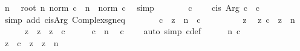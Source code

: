 \begin{isabellebody}
\ n\ \isamarkupfalse%
\ {\isachardoublequoteopen}root\ n\ {\isacharparenleft}{\kern0pt}norm\ c{\isacharparenright}{\kern0pt}\ {\isacharcircum}{\kern0pt}\ n\ {\isacharequal}{\kern0pt}\ norm\ c{\isachardoublequoteclose}\ \isamarkupfalse%
\ simp\isanewline
\ \ \ \ \isamarkupfalse%
\ \isamarkupfalse%
\ c\ \isamarkupfalse%
\ {\isachardoublequoteopen}{\isasymdots}\ {\isacharasterisk}{\kern0pt}\ cis\ {\isacharparenleft}{\kern0pt}Arg\ c{\isacharparenright}{\kern0pt}\ {\isacharequal}{\kern0pt}\ c{\isachardoublequoteclose}\ \isamarkupfalse%
\ {\isacharparenleft}{\kern0pt}simp\ add{\isacharcolon}{\kern0pt}\ cis{\isacharunderscore}{\kern0pt}Arg\ Complex{\isachardot}{\kern0pt}sgn{\isacharunderscore}{\kern0pt}eq{\isacharparenright}{\kern0pt}\isanewline
\ \ \ \ \isamarkupfalse%
\ \isamarkupfalse%
\ {\isachardoublequoteopen}{\isacharparenleft}{\kern0pt}c{\isacharprime}{\kern0pt}\ {\isacharasterisk}{\kern0pt}\ z{\isacharparenright}{\kern0pt}\ {\isacharcircum}{\kern0pt}\ n\ {\isacharequal}{\kern0pt}\ c{\isachardoublequoteclose}\ \isacommand{{\isachardot}{\kern0pt}}\isamarkupfalse%
\isanewline
\ \ \isamarkupfalse%
\isanewline
\ \ \ \ \isamarkupfalse%
\ z\ \isamarkupfalse%
\ z{\isacharcolon}{\kern0pt}\ {\isachardoublequoteopen}c\ {\isacharequal}{\kern0pt}\ z\ {\isacharcircum}{\kern0pt}\ n{\isachardoublequoteclose}\isanewline
\ \ \ \ \isamarkupfalse%
\ z{\isacharprime}{\kern0pt}\ \ {\isachardoublequoteopen}z{\isacharprime}{\kern0pt}\ {\isacharequal}{\kern0pt}\ z\ {\isacharslash}{\kern0pt}\ c{\isacharprime}{\kern0pt}{\isachardoublequoteclose}\isanewline
\ \ \ \ \isamarkupfalse%
\ c\ \ n\ \isamarkupfalse%
\ {\isachardoublequoteopen}c{\isacharprime}{\kern0pt}\ {\isasymnoteq}\ {}{\isachardoublequoteclose}\ \isamarkupfalse%
\ {\isacharparenleft}{\kern0pt}auto\ simp{\isacharcolon}{\kern0pt}\ c{\isacharprime}{\kern0pt}{\isacharunderscore}{\kern0pt}def{\isacharparenright}{\kern0pt}\isanewline
\ \ \ \ \isamarkupfalse%
\ n\ c\ \isamarkupfalse%
\ {\isachardoublequoteopen}z\ {\isacharequal}{\kern0pt}\ c{\isacharprime}{\kern0pt}\ {\isacharasterisk}{\kern0pt}\ z{\isacharprime}{\kern0pt}{\isachardoublequoteclose}\ \ {\isachardoublequoteopen}z{\isacharprime}{\kern0pt}\ {\isacharcircum}{\kern0pt}\ n\ {\isacharequal}{\kern0pt}\ {}{\isachardoublequoteclose}\isanewline

\end{isabellebody}

